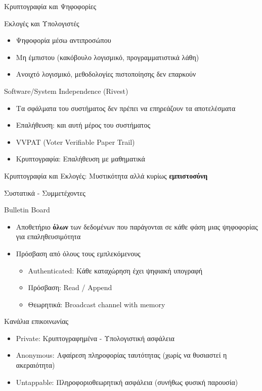 \documentclass[handout]{beamer}
\begin{document}
\begin{section}{Κρυπτογραφία και Ψηφοφορίες}

\begin{frame}{Εκλογές και Υπολογιστές}
\begin{small}
\begin{itemize}
 \item Ψηφοφορία μέσω αντιπροσώπου \pause
 \item Μη έμπιστου (κακόβουλο λογισμικό, προγραμματιστικά λάθη) \pause
 \item Ανοιχτό λογισμικό, μεθοδολογίες πιστοποίησης δεν επαρκούν \pause
\end{itemize}
\begin{block}{Software/System Independence (Rivest)}
\begin{itemize}
 \item Τα σφάλματα του συστήματος δεν πρέπει να επηρεάζουν τα αποτελέσματα  
 \item Επαλήθευση: και αυτή μέρος του συστήματος \pause
 \item VVPAT (Voter Verifiable Paper Trail) \pause
 \item Κρυπτογραφία: Επαλήθευση με μαθηματικά \pause
\end{itemize}
\end{block} \pause
Κρυπτογραφία και Εκλογές: Μυστικότητα αλλά κυρίως \textbf{εμπιστοσύνη}
\end{small}
\end{frame}


\begin{frame}[allowframebreaks]{Συστατικά - Συμμετέχοντες}
\begin{block}{Bulletin Board}
\begin{itemize}
\item Αποθετήριο \textbf{όλων} των δεδομένων που παράγονται σε κάθε φάση μιας ψηφοφορίας για επαληθευσιμότητα 
\item Πρόσβαση από όλους τους εμπλεκόμενους 
\begin{itemize}
\item Authenticated: Κάθε καταχώρηση έχει ψηφιακή υπογραφή 
\item Πρόσβαση: Read / Append 
\item Θεωρητικά: Broadcast channel with memory
\end{itemize}
\end{itemize}
\end{block}

\framebreak

\begin{block}{Κανάλια επικοινωνίας}
\begin{itemize}
  \item Private: Κρυπτογραφημένα - Υπολογιστική ασφάλεια 
  \item Anonymous: Αφαίρεση πληροφορίας ταυτότητας (χωρίς να θυσιαστεί η ακεραιότητα) 
  \item Untappable: Πληροφοριοθεωρητική ασφάλεια (συνήθως φυσική παρουσία)
\end{itemize}
\end{block}



\end{frame}
\end{section}
\end{document}
